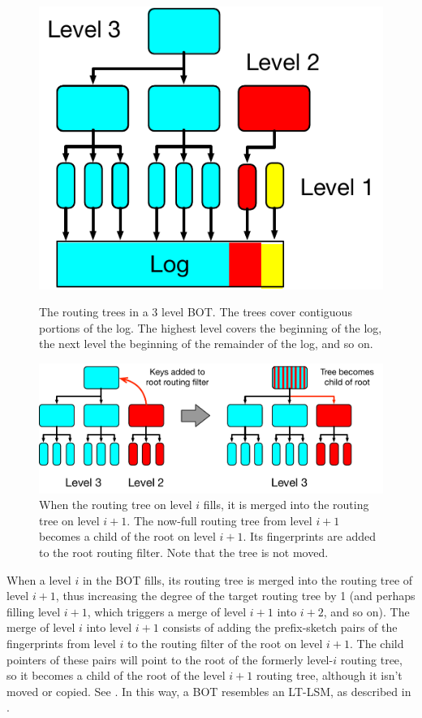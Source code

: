 \begin{figure}[h!]
	\centering
	\begin{minipage}[t]{0.4\textwidth}
		\centering
		\includegraphics[height=0.5\textwidth]{figures/routing_tree.pdf}
		\caption{The routing trees in a 3 level BOT. The trees
                  cover contiguous portions of the log.  The highest
                  level covers the beginning of the log, the next
                  level the beginning of the remainder of the log, and so on.}
		\label{fig:routing_tree}
	\end{minipage}\hfill
	\begin{minipage}[t]{0.55\textwidth}
		\centering
		\includegraphics[height=0.4\textwidth]{figures/routing_tree_merge.pdf}
		\caption{When the routing tree on level $i$ fills, it is merged into
			the routing tree on level $i+1$. The now-full routing tree from
			level $i+1$ becomes a child of the root on level $i+1$. Its
			fingerprints are added to the root routing filter. Note that the
			tree is not moved.}
		\label{fig:routing_tree_merge}
	\end{minipage}
\end{figure}

When a level $i$ in the BOT fills, its routing tree is merged into the routing
tree of level $i+1$, thus increasing the degree of the target routing tree by 1 (and
perhaps filling level $i+1$, which triggers a merge of level $i+1$ into
$i+2$, and so on). The merge of level $i$ into level $i+1$ consists of adding
the prefix-sketch pairs of the fingerprints from level $i$ to the routing
filter of the root on level $i+1$. The child pointers of these pairs will point
to the root of the formerly level-$i$ routing tree, so it becomes a child of
the root of the level $i+1$ routing tree, although it isn't moved or copied.
See . In this way, a BOT resembles an LT-LSM, as
described in .

